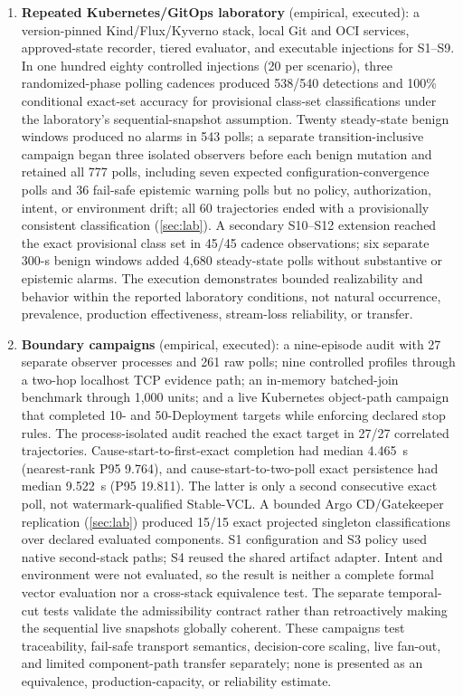 \begin{enumerate}[label=\textbf{C\arabic*.},leftmargin=2.2em,itemsep=1.5pt,topsep=2pt]
and it makes no claim about any real cluster.
\item \textbf{Repeated Kubernetes/GitOps laboratory} (empirical, executed): a
version-pinned Kind/Flux/Kyverno stack, local Git and OCI services, approved-state
recorder, tiered evaluator, and executable injections for S1--S9. In one
hundred eighty controlled injections (20 per scenario), three randomized-phase
polling cadences produced 538/540 detections and 100\% conditional exact-set
accuracy for provisional class-set classifications under the laboratory's
sequential-snapshot assumption. Twenty steady-state benign windows produced no alarms in 543 polls;
a separate transition-inclusive campaign began three isolated observers before
each benign mutation and retained all 777 polls, including seven expected
configuration-convergence polls and 36 fail-safe epistemic warning polls but
no policy, authorization, intent, or environment drift; all 60 trajectories
ended with a provisionally consistent classification
(\cref{sec:lab}). A secondary S10--S12 extension reached
the exact provisional class set in 45/45 cadence observations; six separate 300-s benign windows
added 4,680 steady-state polls without substantive or epistemic alarms. The execution
demonstrates bounded realizability and behavior within the reported laboratory conditions, not natural occurrence,
prevalence, production effectiveness, stream-loss reliability, or transfer.
\item \textbf{Boundary campaigns} (empirical, executed): a nine-episode audit
with 27 separate observer processes and 261 raw polls; nine controlled profiles
through a two-hop localhost TCP evidence path; an in-memory batched-join
benchmark through 1,000 units; and a live Kubernetes object-path campaign that
completed 10- and 50-Deployment targets while enforcing declared stop rules.
The process-isolated audit reached the exact target in 27/27 correlated
trajectories. Cause-start-to-first-exact completion had median 4.465~s
(nearest-rank P95 9.764), and cause-start-to-two-poll exact persistence had
median 9.522~s (P95 19.811). The latter is only a second consecutive exact poll,
not watermark-qualified Stable-VCL. A bounded Argo CD/Gatekeeper replication
(\cref{sec:lab}) produced 15/15 exact projected singleton classifications over
declared evaluated components. S1 configuration and S3 policy used native
second-stack paths; S4 reused the shared artifact adapter. Intent and
environment were not evaluated, so the result is neither a complete formal
vector evaluation nor a cross-stack equivalence test.
The separate temporal-cut tests validate the admissibility contract rather
than retroactively making the sequential live snapshots globally coherent.
These campaigns
test traceability, fail-safe transport semantics, decision-core scaling, live
fan-out, and limited component-path transfer separately; none is presented as
an equivalence, production-capacity, or reliability estimate.
\end{enumerate}


